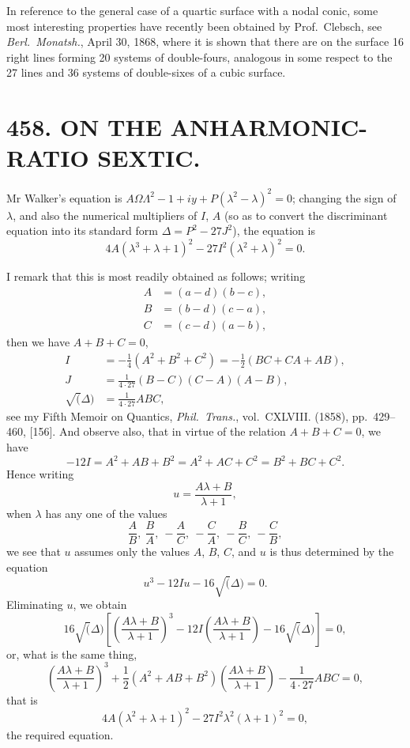 \documentclass[11pt,a4paper]{article}
\newcommand{\article}[2]{\section*{#1. #2}}
\begin{document}
In reference to the general case of a quartic surface with a nodal conic, some most interesting properties have recently been obtained by Prof.~Clebsch, see \textit{Berl.\ Monatsh.}, April 30, 1868, where it is shown that there are on the surface 16 right lines forming 20 systems of double-fours, analogous in some respect to the 27 lines and 36 systems of double-sixes of a cubic surface.

\newpage
\setcounter{page}{314}

\article{458}{ON THE ANHARMONIC-RATIO SEXTIC.}


\vspace{0.5em}

Mr Walker's equation is $A\Omega\Lambda^{2} - 1 + iy + P(\lambda^{2} - \lambda)^{2} = 0$; changing the sign of $\lambda$, and also the numerical multipliers of $I$, $A$ (so as to convert the discriminant equation into its standard form $\Delta = P^{2} - 27J^{2}$), the equation is
\[
4A(\lambda^{3} + \lambda + 1)^{2} - 27I^{2}(\lambda^{2} + \lambda)^{2} = 0.
\]

I remark that this is most readily obtained as follows; writing
\begin{align*}
A &= (a-d)(b-c),\\
B &= (b-d)(c-a),\\
C &= (c-d)(a-b),
\end{align*}
then we have $A + B + C = 0$,
\begin{align*}
I &= -\tfrac{1}{4}(A^{2} + B^{2} + C^{2}) = -\tfrac{1}{2}(BC + CA + AB),\\
J &= \tfrac{1}{4\cdot 27}(B-C)(C-A)(A-B),\\
\surd(\Delta) &= \tfrac{1}{4\cdot 27}ABC,
\end{align*}
see my Fifth Memoir on Quantics, \textit{Phil.\ Trans.}, vol.~CXLVIII. (1858), pp.~429--460, [156]. And observe also, that in virtue of the relation $A + B + C = 0$, we have
\[
-12I = A^{2} + AB + B^{2} = A^{2} + AC + C^{2} = B^{2} + BC + C^{2}.
\]
Hence writing
\[
u = \frac{A\lambda + B}{\lambda + 1},
\]
when $\lambda$ has any one of the values
\[
\frac{A}{B},\ \frac{B}{A},\ -\frac{A}{C},\ -\frac{C}{A},\ -\frac{B}{C},\ -\frac{C}{B},
\]
we see that $u$ assumes only the values $A$, $B$, $C$, and $u$ is thus determined by the equation
\[
u^{3} - 12Iu - 16\surd(\Delta) = 0.
\]
Eliminating $u$, we obtain
\[
16\surd(\Delta)\left[\left(\frac{A\lambda+B}{\lambda+1}\right)^{3} - 12I\left(\frac{A\lambda+B}{\lambda+1}\right) - 16\surd(\Delta)\right] = 0,
\]
or, what is the same thing,
\[
\left(\frac{A\lambda+B}{\lambda+1}\right)^{3} + \frac{1}{2}(A^{2}+AB+B^{2})\left(\frac{A\lambda+B}{\lambda+1}\right) - \frac{1}{4\cdot 27}ABC = 0,
\]
that is
\[
4A(\lambda^{2}+\lambda+1)^{2} - 27I^{2}\lambda^{2}(\lambda+1)^{2} = 0,
\]
the required equation.
\end{document}
